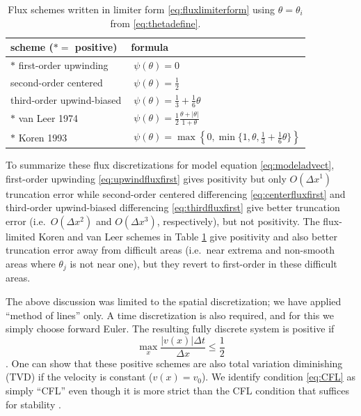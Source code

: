 \documentclass[11pt,final]{amsart}
\begin{document}
\begin{table}[ht]
  \centering
  \caption{Flux schemes written in limiter form \eqref{eq:fluxlimiterform} using $\theta=\theta_i$ from \eqref{eq:thetadefine}.}
  \begin{tabular}{ll}
    \textbf{scheme ($\ast=$ positive)} & \textbf{formula} \\
\hline
    $\ast$ first-order upwinding               & $\phantom{\Big|}\psi(\theta) = 0$ \\
    \phantom{$\ast$} second-order centered     & $\phantom{\Big|}\psi(\theta) = \frac{1}{2}$  \\
    \phantom{$\ast$} third-order upwind-biased & $\phantom{\Big|}\psi(\theta) = \frac{1}{3}+\frac{1}{6} \theta$  \\
    $\ast$ van Leer 1974                       & $\phantom{\Big|}\psi(\theta) = \frac{1}{2} \frac{\theta + |\theta|}{1+\theta}$  \\
    $\ast$ Koren 1993                          & $\phantom{\Big|}\psi(\theta) = \max\left\{0,\min\{1,\theta,\frac{1}{3}+\frac{1}{6} \theta\}\right\}$  \\
    \hline
  \end{tabular}
 \label{tab:fluxlimiters}
\end{table}

To summarize these flux discretizations for model equation \eqref{eq:modeladvect}, first-order upwinding \eqref{eq:upwindfluxfirst} gives positivity but only $O(\Delta x^1)$ truncation error while second-order centered differencing \eqref{eq:centerfluxfirst} and third-order upwind-biased differencing \eqref{eq:thirdfluxfirst} give better truncation error (i.e.~$O(\Delta x^2)$ and $O(\Delta x^3)$, respectively), but not positivity.  The flux-limited Koren and van Leer schemes in Table \ref{tab:fluxlimiters} give positivity and also better truncation error away from difficult areas (i.e.~near extrema and non-smooth areas where $\theta_j$ is not near one), but they revert to first-order in these difficult areas.

The above discussion was limited to the spatial discretization; we have applied ``method of lines'' only.  A time discretization is also required, and for this we simply choose forward Euler.  The resulting fully discrete system is positive if
\begin{equation}
\max_x \frac{|v(x)|\Delta t}{\Delta x} \le \frac{1}{2} \label{eq:CFL}
\end{equation}
\citep[section III.1.1]{HundsdorferVerwer2010}.  One can show that these positive schemes are also total variation diminishing (TVD) if the velocity is constant ($v(x)=v_0$).  We identify condition \eqref{eq:CFL} as simply ``CFL'' even though it is more strict than the CFL condition that suffices for stability \citep{MortonMayers}.
\end{document}
